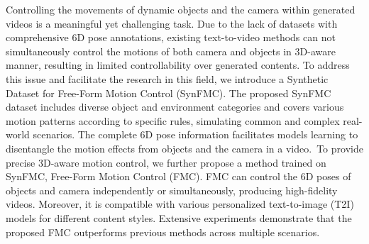 \begin{abstract}
Controlling the movements of dynamic objects and the camera within generated videos is a meaningful yet challenging task. Due to the lack of datasets with comprehensive 6D pose annotations, existing text-to-video methods can not simultaneously control the motions of both camera and objects in 3D-aware manner, resulting in limited controllability over generated contents. To address this issue and facilitate the research in this field, we introduce a \textbf{\underline{Syn}}thetic Dataset for \textbf{\underline{F}}ree-Form \textbf{\underline{M}}otion \textbf{\underline{C}}ontrol (\textbf{\datasetname}). The proposed \datasetname dataset includes diverse object and environment categories and covers various motion patterns according to specific rules, simulating common and complex real-world scenarios. The complete 6D pose information facilitates models learning to disentangle the motion effects from objects and the camera in a video.~To provide precise 3D-aware motion control, we further propose a method trained on~\datasetname, \methodcompletename (\methodname). \methodname can control the 6D poses of objects and camera independently or simultaneously, producing high-fidelity videos. Moreover, it is compatible with various personalized text-to-image (T2I) models for different content styles. Extensive experiments demonstrate that the proposed \methodname outperforms previous methods across multiple scenarios. 

\end{abstract}


Controlling the movements of dynamic objects and the camera within generated videos is a meaningful yet challenging task. Due to the lack of datasets with comprehensive 6D pose annotations, existing text-to-video methods can not simultaneously control the motions of both camera and objects in 3D-aware manner, resulting in limited controllability over generated contents. To address this issue and facilitate the research in this field, we introduce a Synthetic Dataset for Free-Form Motion Control (SynFMC). The proposed SynFMC dataset includes diverse object and environment categories and covers various motion patterns according to specific rules, simulating common and complex real-world scenarios. The complete 6D pose information facilitates models learning to disentangle the motion effects from objects and the camera in a video.~To provide precise 3D-aware motion control, we further propose a method trained on SynFMC, Free-Form Motion Control (FMC). FMC can control the 6D poses of objects and camera independently or simultaneously, producing high-fidelity videos. Moreover, it is compatible with various personalized text-to-image (T2I) models for different content styles. Extensive experiments demonstrate that the proposed FMC outperforms previous methods across multiple scenarios. 
\fi

